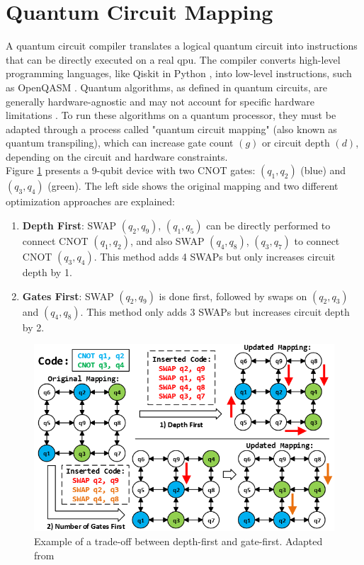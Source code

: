 \section{Quantum Circuit Mapping} %
A quantum circuit compiler translates a logical quantum circuit into instructions that can be directly executed on a real \acrshort{qpu}. The compiler converts high-level programming languages, like Qiskit in Python \cite{aleksandrowicz_qiskit_2019}, into low-level instructions, such as OpenQASM \cite{cross_open_2017}. Quantum algorithms, as defined in quantum circuits, are generally hardware-agnostic and may not account for specific hardware limitations \cite{ash-saki_qure_2019}. To run these algorithms on a quantum processor, they must be adapted through a process called "quantum circuit mapping" (also known as quantum transpiling), which can increase gate count $(g)$ or circuit depth $(d)$, depending on the circuit and hardware constraints. \\
Figure \ref{fig:tackling-depth-gate-first} presents a 9-qubit device with two CNOT gates: $(q_1, q_2)$ (blue) and $(q_3, q_4)$ (green). The left side shows the original mapping and two different optimization approaches are explained:
\begin{enumerate}[nolistsep]
    \item \textbf{Depth First}: SWAP $(q_2, q_9)$, $(q_1, q_5)$ can be directly performed to connect CNOT $(q_1, q_2)$, and also SWAP $(q_4, q_8)$, $(q_3, q_7)$ to connect CNOT $(q_3, q_4)$. This method adds 4 SWAPs but only increases circuit depth by 1.
    \item \textbf{Gates First}: SWAP $(q_2, q_9)$ is done first, followed by swaps on $(q_2, q_3)$ and $(q_4, q_8)$. This method only adds 3 SWAPs but increases circuit depth by 2.
\end{enumerate} 
\begin{figure}[htb]
    \centering
    \includegraphics[width=0.6\linewidth]{image/tackling_depth_gate_first.png}
    \caption{Example of a trade-off between depth-first and gate-first. Adapted from \cite{li_tackling_2019}}
    \label{fig:tackling-depth-gate-first}
\end{figure}

